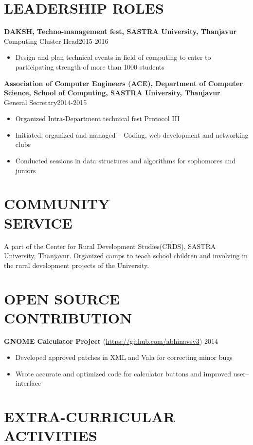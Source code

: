\documentclass[margin, 10pt]{res} %
\begin{document}
\begin{resume}
{{{{\begin{itemize}
\end{itemize}
\section {LEADERSHIP ROLES}
\textbf{DAKSH, Techno-management fest, SASTRA University, Thanjavur}\\
Computing Cluster Head\hfill 2015-2016
\begin{itemize}\itemsep -2pt
\item Design and plan technical events in field of computing to cater to participating strength of more than 1000 students\end{itemize}
\textbf{Association of Computer Engineers (ACE), Department of Computer Science, School of Computing, SASTRA University, Thanjavur}\\
General Secretary\hfill 2014-2015
\begin{itemize}\itemsep -2pt
\item Organized Intra-Department technical fest Protocol III
\item Initiated, organized and managed -- Coding, web development and networking clubs
\item Conducted sessions in data structures and algorithms for sophomores and juniors
\end{itemize}
\section{COMMUNITY \\ SERVICE}
A part of the Center for Rural Development Studies(CRDS), SASTRA University, Thanjavur.
Organized camps to teach school children and involving in the rural development projects of the University.

\section{OPEN SOURCE CONTRIBUTION} \textbf{GNOME Calculator Project} (\url{https://github.com/abhinavsv3}) \hfill 2014
\begin{itemize} \itemsep -2pt %
\item Developed approved patches in XML and Vala for correcting minor bugs
\item Wrote accurate and optimized code for calculator buttons and improved user--interface
\end{itemize}
\section{EXTRA-CURRICULAR \\ ACTIVITIES} 

}}}}
\end{resume}
\end{document}
